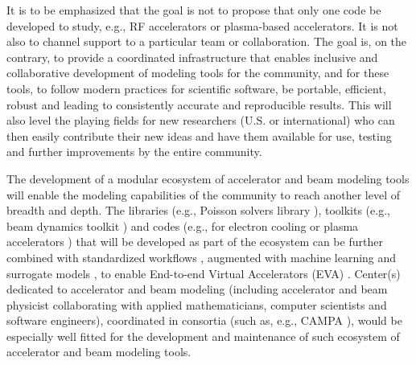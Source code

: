 \documentclass[11pt,sort&compress]{article}
\begin{document}
It is to be emphasized that the goal is not to propose that only one code be developed to study, e.g., RF accelerators or plasma-based accelerators. It is not also to channel support to a particular team or collaboration. 
The goal is, on the contrary, to provide a coordinated infrastructure that enables inclusive and collaborative development of modeling tools for the community, and for these tools, to follow modern practices for scientific software, be portable, efficient, robust and leading to consistently accurate and reproducible results.
This will also level the playing fields for new researchers (U.S. or international) who can then easily contribute their new ideas and have them available for use, testing and further improvements by the entire community.

The development of a modular ecosystem of accelerator and beam modeling tools will enable the modeling capabilities of the community to reach another level of breadth and depth. The libraries (e.g., Poisson solvers library \cite{LOI_Poisson}), toolkits (e.g., beam dynamics toolkit \cite{LOI_toolkit}) and codes (e.g., for electron cooling \cite{LOI_ECool} or plasma accelerators \cite{LOI_PlasmaAcc}) that will be developed as part of the ecosystem can be further combined with standardized workflows \cite{LOI_standards}, augmented with machine learning and surrogate models \cite{LOI_ML}, to enable End-to-end Virtual Accelerators (EVA) \cite{LOI_EVA}. Center(s) dedicated to accelerator and beam modeling \cite{LOI_Center} (including accelerator and beam physicist collaborating with applied mathematicians, computer scientists and software engineers), coordinated in consortia (such as, e.g., CAMPA \cite{CAMPA}), would be especially well fitted for the development and maintenance of such ecosystem of accelerator and beam modeling tools. 
\pagebreak

\printbibliography
\end{document}
